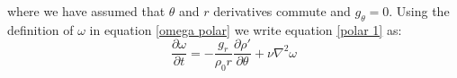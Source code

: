 \documentclass{article}
\begin{document}
where we have assumed that $\theta$ and $r$ derivatives commute and $g_{\theta}=0$. Using the definition of $\omega$ in equation \ref{omega polar} we write equation \ref{polar 1} as:
\begin{equation}
	\frac{\partial \omega}{\partial t} = - \frac{g_r}{\rho_0 r} \frac{\partial \rho'}{\partial \theta} +\nu \nabla^2 \omega
	\label{polar vorticity}
\end{equation}















 
\end{document}
